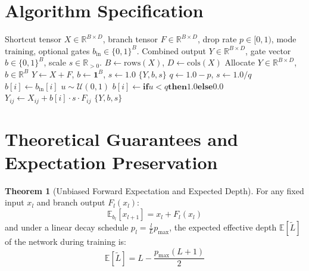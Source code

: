 \documentclass[11pt,a4paper]{article}
\theoremstyle{definition}
\newtheorem{theorem}{Theorem}[section]
\begin{document}
\section{Algorithm Specification}

\begin{algorithm}[H]
\caption{Stochastic Depth (DropPath) Forward Execution}
\label{alg:stochastic_depth}
\begin{algorithmic}[1]
\Require Shortcut tensor $X \in \mathbb{R}^{B \times D}$, branch tensor $F \in \mathbb{R}^{B \times D}$, drop rate $p \in [0, 1)$, mode $\text{training}$, optional gates $b_{\text{in}} \in \{0, 1\}^B$.
\Ensure Combined output $Y \in \mathbb{R}^{B \times D}$, gate vector $b \in \{0, 1\}^B$, scale $s \in \mathbb{R}_{> 0}$.
\State $B \gets \text{rows}(X)$, $D \gets \text{cols}(X)$
\State Allocate $Y \in \mathbb{R}^{B \times D}$, $b \in \mathbb{R}^B$
    \State $Y \gets X + F$, $b \gets \mathbf{1}^B$, $s \gets 1.0$
    \State \Return $\{Y, b, s\}$
\EndIf
\State $q \gets 1.0 - p$, $s \gets 1.0 / q$
        \State $b[i] \gets b_{\text{in}}[i]$
    \Else
        \State $u \sim \mathcal{U}(0, 1)$
        \State $b[i] \gets \mathbf{if } u < q \mathbf{ then } 1.0 \mathbf{ else } 0.0$
    \EndIf
        \State $Y_{ij} \gets X_{ij} + b[i] \cdot s \cdot F_{ij}$
    \EndFor
\EndFor
\State \Return $\{Y, b, s\}$
\end{algorithmic}
\end{algorithm}

\section{Theoretical Guarantees and Expectation Preservation}

\begin{theorem}[Unbiased Forward Expectation and Expected Depth]
For any fixed input $x_l$ and branch output $F_l(x_l)$:
\begin{equation}
\mathbb{E}_{b_l} [x_{l+1}] = x_l + F_l(x_l)
\end{equation}
and under a linear decay schedule $p_l = \frac{l}{L} p_{\text{max}}$, the expected effective depth $\mathbb{E}[\tilde{L}]$ of the network during training is:
\begin{equation}
\mathbb{E}[\tilde{L}] = L - \frac{p_{\text{max}} (L + 1)}{2}
\end{equation}
\end{theorem}
\end{document}
